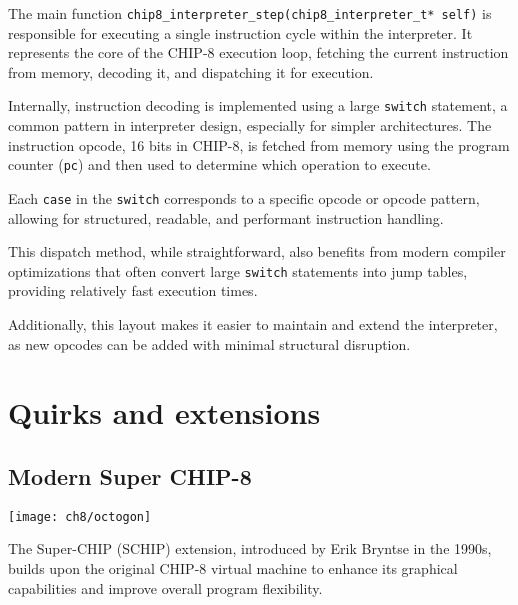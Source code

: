 \par The main function \texttt{chip8\_interpreter\_step(chip8\_interpreter\_t* self)} is responsible for executing a single instruction cycle within the interpreter. It represents the core of the CHIP-8 execution loop, fetching the current instruction from memory, decoding it, and dispatching it for execution.

\par Internally, instruction decoding is implemented using a large \texttt{switch} statement, a common pattern in interpreter design, especially for simpler architectures. The instruction opcode, 16 bits in CHIP-8, is fetched from memory using the program counter (\texttt{pc}) and then used to determine which operation to execute.

\par Each \texttt{case} in the \texttt{switch} corresponds to a specific opcode or opcode pattern, allowing for structured, readable, and performant instruction handling.

\par This dispatch method, while straightforward, also benefits from modern compiler optimizations that often convert large \texttt{switch} statements into jump tables, providing relatively fast execution times.

\par Additionally, this layout makes it easier to maintain and extend the interpreter, as new opcodes can be added with minimal structural disruption.

\section{Quirks and extensions}
\label{sec:ch3sec4}

\subsection{Modern Super CHIP-8}
\label{subsec:ch3sec4sub1}

\begin{minipage}{\linewidth}
\texttt{[image: ch8/octogon]}
\centering
{}
\end{minipage}

\par The Super-CHIP (SCHIP) extension, introduced by Erik Bryntse in the 1990s, builds upon the original CHIP-8 virtual machine to enhance its graphical capabilities and improve overall program flexibility.

